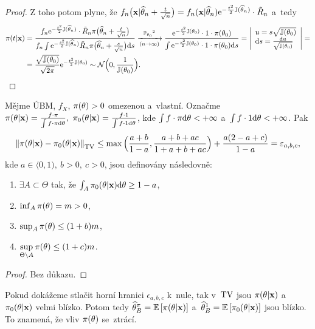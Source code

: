 \begin{dusl}
\begin{proof}
		Z toho potom plyne, že $f_n\big(\textbf{x}|\widehat{\theta}_n+\frac{t}{\sqrt{n}}\big)=f_n(\textbf{x}|\widehat{\theta}_n)\mathrm{e}^{-\frac{t^2}{2}\mathbb{J}(\widehat{\theta}_n)}\cdot\tilde{R}_n$ a~tedy \[
		\begin{split}
		\pi(t|\textbf{x})&=\frac{f_n\e{-\frac{t^2}{2}\mathbb{J}(\htn)}\cdot\tilde{R}_n \pi\big( \htn+\frac{t}{\sqrt{n}} \big)}{f_n\int \e{-\frac{s^2}{2}\mathbb{J}(\htn)}\tilde{R}_n \pi\big(\htn+\frac{s}{\sqrt{n}}\big)\d s}\xrightarrow[(n\rightarrow \infty)]{\PP_{\t_0}\text{\footnotemark}}\frac{\e{-\frac{t^2}{2}\mathbb{J}(\t_0)}\cdot1\cdot \pi(\t_0)}{\int\e{-\frac{s^2}{2}\mathbb{J}(\t_0)}\cdot1\cdot\pi(\t_0)\d s}=\left| \begin{array}{l}
		u=s\sqrt{\mathbb{J}(\t_0)}\\\d s=\frac{\d u}{\sqrt{\mathbb{J}(\t_0)}}		
		\end{array}
		\right|=\\&=\frac{\sqrt{\mathbb{J}(\t_0)}}{\sqrt{2\pi}}\e{-\frac{t^2}{2}\mathbb{J}(\t_0)}\sim\NN\Big( 0,\frac{1}{\mathbb{J}(\t_0)} \Big).
		\end{split}
		\]
	\end{proof}
\end{dusl}
\begin{theorem}
	Mějme ÚBM, $f_X$, $\pi(\theta)>0$ omezenou a~vlastní. Označme $\pi(\theta|\textbf{x})=\frac{f\cdot\pi}{\int f\cdot\pi\mathrm{d}\theta},~\pi_0(\theta|\textbf{x})=\frac{f\cdot1}{\int f\cdot1 \mathrm{d}\theta}$, kde $\int f\cdot\pi\mathrm{d}\theta<+\infty$ a~$\int f\cdot1 \mathrm{d}\theta<+\infty$. Pak
	$$ \left\|\pi(\theta|\textbf{x})-\pi_0(\theta|\textbf{x})\right\|_{\mathrm{TV}}\leq \max\Big(\frac{a+b}{1-a},\frac{a+b+ac}{1+a+b+ac}\Big)+\frac{a(2-a+c)}{1-a}=\varepsilon_{a,b,c},$$
	kde $a\in\langle 0,1),~b>0,~c>0$, jsou definovány následovně:\begin{enumerate}[1)]
		\item $\exists A\subset \Theta$ tak, že $\int_A \pi_0(\theta|\textbf{x})\mathrm{d}\theta\geq 1-a$,
		\item $\inf_A \pi(\theta)=m>0$,
		\item $\sup_A \pi(\theta)\leq (1+b)m$,
		\item $\sup\limits_{\Theta\setminus A} \pi(\theta)\leq(1+c)m$. 
	\end{enumerate}
\end{theorem}
\begin{proof}
Bez důkazu.
\end{proof}
\begin{dusl}
	Pokud dokážeme stlačit horní hranici $\epsilon_{a,b,c}$ k~nule, tak v~$\mathrm{TV}$ jsou $\pi(\theta|\textbf{x})$ a~$\pi_0(\theta|\textbf{x})$ velmi blízko. Potom tedy $\widehat{\theta}_B^\pi=\mathbb{E}\left[ \pi(\theta|\textbf{x}) \right]$ a~$\widehat{\theta}_B^1=\mathbb{E}\left[ \pi_0(\theta|\textbf{x}) \right]$ jsou blízko. To znamená, že vliv $\pi(\theta)$ se~ztrácí.
\end{dusl}
